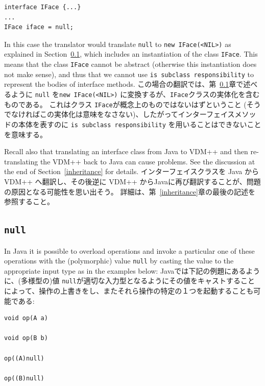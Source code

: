 \documentclass[\pformat,12pt]{jarticle}
\begin{document}
\begin{small}
\begin{verbatim}
interface IFace {...}
...
IFace iface = null;
\end{verbatim}
\end{small}

In this case the translator would translate \texttt{null} to
\texttt{new IFace(<NIL>)} as explained in 
Section~\ref{null}, which includes an instantiation of the class
\texttt{IFace}. This means that the class \texttt{IFace} cannot be
abstract (otherwise this instantiation does not make sense), and thus
that we cannot use \texttt{is subclass responsibility} to represent
the bodies of interface methods.
この場合の翻訳では、第~\ref{null}章で述べるように \texttt{null} を\texttt{new IFace(<NIL>)} に変換するが、\texttt{IFace}クラスの実体化を含むものである。 
これはクラス \texttt{IFace}が概念上のものではないはずということ (そうでなければこの実体化は意味をなさない)、したがってインターフェイスメソッドの本体を表すのに \texttt{is subclass responsibility} を用いることはできないことを意味する。

Recall also that translating an interface class from Java to VDM++ and
then re-translating the VDM++ back to Java can cause problems. See the
discussion at the end of Section~\ref{inheritance} for details.
インターフェイスクラスを Java から VDM++ へ翻訳し、その後逆に VDM++ からJavaに再び翻訳することが、問題の原因となる可能性を思い出そう。
詳細は、第~\ref{inheritance}章の最後の記述を参照すること。


\subsection{\texttt{null}}\label{null}

In Java it is possible to overload operations and invoke a particular
one of these operations with the (polymorphic) value \texttt{null} by
casting the value to the appropriate input type as in the examples
below: 
Javaでは下記の例題にあるように、(多様型の)値 \texttt{null}が適切な入力型となるようにその値をキャストすることによって、操作の上書きをし、またそれら操作の特定の１つを起動することも可能である: 

\begin{small}
\begin{verbatim}
void op(A a)  
 
void op(B b)   

op((A)null)

op((B)null)
\end{verbatim}
\end{small}
\end{document}
